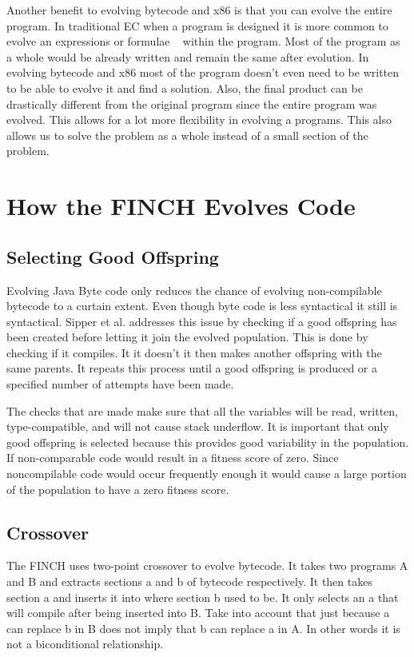 \documentclass{sig-alternate}
\begin{document}
Another benefit to evolving bytecode and x86 is that you can evolve the entire program. In traditional EC when a program is designed it is more common to evolve an expressions or formulae ~\cite{FINCH:2010} within the program. Most of the program as a whole would be already written and remain the same after evolution. In evolving bytecode and x86 most of the program doesn't even need to be written to be able to evolve it and find a solution. Also, the final product can be drastically different from the original program since the entire program was evolved. This allows for a lot more flexibility in evolving a programs. This also allows us to solve the problem as a whole instead of a small section of the problem.


\section{How the FINCH Evolves Code}

\subsection{Selecting Good Offspring}
Evolving Java Byte code only reduces the chance of evolving non-compilable bytecode to a curtain extent. Even though byte code is less syntactical it still is syntactical. Sipper et al.\cite{FINCH2:2009} addresses this issue by checking if a good offspring has been created before letting it join the evolved population. This is done by checking if it compiles. It it doesn't it then makes another offspring with the same parents. It repeats this process until a good offspring is produced or a specified number of attempts have been made.\par
The checks that are made make sure that all the variables will be read, written, type-compatible, and will not cause stack underflow\cite{VIII:2011}.
It is important that only good offspring is selected because this provides good variability in the population. If non-comparable code would result in a fitness score of zero. Since noncompilable code would occur frequently enough it would cause a large portion of the population to have a zero fitness score.

\subsection{Crossover}


The FINCH uses two-point crossover to evolve bytecode. It takes two programs A and B and extracts sections a and b of bytecode respectively. It then takes section a and inserts it into where section b used to be. It only selects an a that will compile after being inserted into B. Take into account that just because a can replace b in B does not imply that b can replace a in A. In other words it is not a biconditional relationship.
\end{document}
